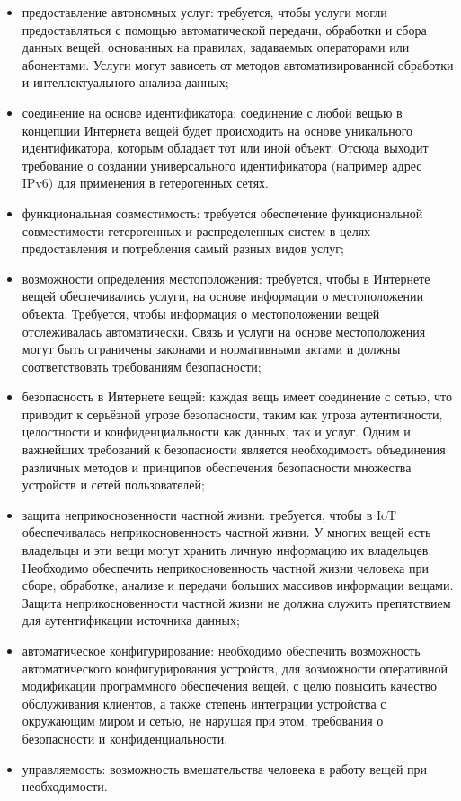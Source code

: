 \begin{itemize}
	\item предоставление автономных услуг: требуется, чтобы услуги могли 
предоставляться с помощью автоматической передачи, обработки и сбора данных 
вещей, основанных на правилах, задаваемых операторами или абонентами. Услуги 
могут зависеть от методов автоматизированной обработки и интеллектуального 
анализа данных;
	\item соединение на основе идентификатора: соединение с любой вещью в 
концепции Интернета вещей будет происходить на основе уникального 
идентификатора, которым обладает тот или иной объект. Отсюда выходит требование 
о создании универсального идентификатора (например адрес IPv6) для применения в 
гетерогенных сетях. \item функциональная совместимость: требуется обеспечение 
функциональной совместимости гетерогенных и распределенных систем в целях 
предоставления и потребления самый разных видов услуг;
	\item  возможности определения местоположения: требуется, чтобы в 
Интернете вещей обеспечивались услуги, на основе информации о местоположении 
объекта. Требуется, чтобы информация о местоположении вещей отслеживалась 
автоматически. Связь и услуги на основе местоположения могут быть ограничены 
законами и нормативными актами и должны соответствовать требованиям 
безопасности; \item безопасность в Интернете вещей: каждая вещь имеет соединение 
с сетью, что приводит к серьёзной угрозе безопасности, таким как угроза 
аутентичности, целостности и конфиденциальности как данных, так и услуг. Одним и 
важнейших требований к безопасности является необходимость объединения 
различных 
методов и принципов обеспечения безопасности множества устройств и сетей 
пользователей;
	\item защита неприкосновенности частной жизни: требуется, чтобы в IoT 
обеспечивалась неприкосновенность частной жизни. У многих вещей есть владельцы и 
эти вещи могут хранить личную информацию их владельцев. Необходимо обеспечить 
неприкосновенность частной жизни человека при сборе, обработке, анализе и 
передачи больших массивов информации вещами. Защита неприкосновенности частной 
жизни не должна служить препятствием для аутентификации источника данных; \item 
автоматическое конфигурирование: необходимо обеспечить возможность 
автоматического конфигурирования устройств, для возможности оперативной 
модификации программного обеспечения вещей, с целю повысить качество 
обслуживания клиентов, а также степень интеграции устройства с окружающим миром 
и сетью, не нарушая при этом, требования о безопасности и конфиденциальности.
	\item управляемость: возможность вмешательства человека в работу вещей 
при необходимости. 
\end{itemize}


